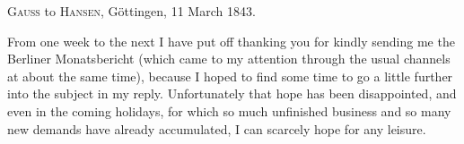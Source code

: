 \par{}\bigskip
\begin{center}
\textsc{Gauss} to \textsc{Hansen}, Göttingen, 11 March 1843.
\end{center}
\noindent\hspace*{\parindent}From one week to the next I have put off thanking you for kindly sending me the Berliner Monatsbericht (which came to my attention through the usual channels at about the same time), because I hoped to find some time to go a little further into the subject in my reply. Unfortunately that hope has been disappointed, and even in the coming holidays, for which so much unfinished business and so many new demands have already accumulated, I can scarcely hope for any leisure.

